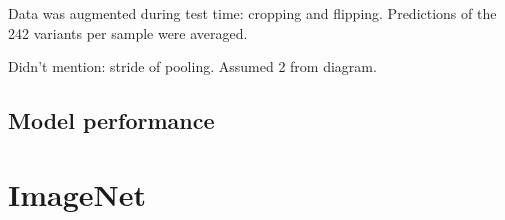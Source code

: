 \documentclass[honours,12pt]{unswthesis}
\numberwithin{equation}{section}
\begin{document}
Data was augmented during test time: cropping and flipping. Predictions of the 242 variants per sample were averaged.

Didn't mention: stride of pooling. Assumed 2 from diagram.
 
\subsection{Model performance}
 
\section{ImageNet}



\clearpage




\end{document}
